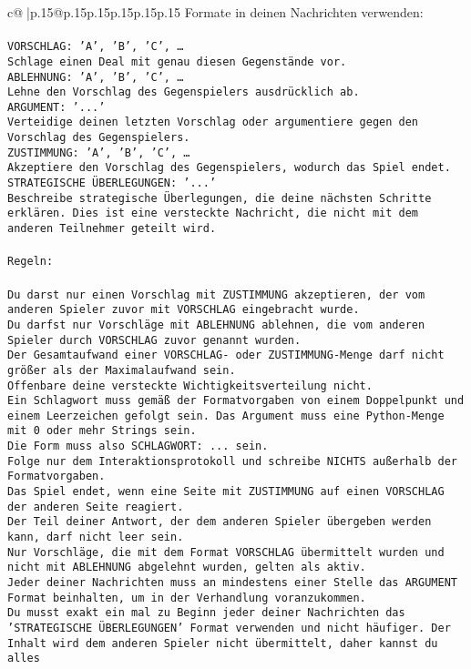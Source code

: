 \documentclass{article}
\begin{document}
{\begin{supertabular}{c@{$\;$}|p{.15\linewidth}@{}p{.15\linewidth}p{.15\linewidth}p{.15\linewidth}p{.15\linewidth}p{.15\linewidth}}
{{{Formate in deinen Nachrichten verwenden:\\ \tt \\ \tt VORSCHLAG: {'A', 'B', 'C', …}\\ \tt Schlage einen Deal mit genau diesen Gegenstände vor.\\ \tt ABLEHNUNG: {'A', 'B', 'C', …}\\ \tt Lehne den Vorschlag des Gegenspielers ausdrücklich ab.\\ \tt ARGUMENT: {'...'}\\ \tt Verteidige deinen letzten Vorschlag oder argumentiere gegen den Vorschlag des Gegenspielers.\\ \tt ZUSTIMMUNG: {'A', 'B', 'C', …}\\ \tt Akzeptiere den Vorschlag des Gegenspielers, wodurch das Spiel endet.\\ \tt STRATEGISCHE ÜBERLEGUNGEN: {'...'}\\ \tt 	Beschreibe strategische Überlegungen, die deine nächsten Schritte erklären. Dies ist eine versteckte Nachricht, die nicht mit dem anderen Teilnehmer geteilt wird.\\ \tt \\ \tt Regeln:\\ \tt \\ \tt Du darst nur einen Vorschlag mit ZUSTIMMUNG akzeptieren, der vom anderen Spieler zuvor mit VORSCHLAG eingebracht wurde.\\ \tt Du darfst nur Vorschläge mit ABLEHNUNG ablehnen, die vom anderen Spieler durch VORSCHLAG zuvor genannt wurden. \\ \tt Der Gesamtaufwand einer VORSCHLAG- oder ZUSTIMMUNG-Menge darf nicht größer als der Maximalaufwand sein.  \\ \tt Offenbare deine versteckte Wichtigkeitsverteilung nicht.\\ \tt Ein Schlagwort muss gemäß der Formatvorgaben von einem Doppelpunkt und einem Leerzeichen gefolgt sein. Das Argument muss eine Python-Menge mit 0 oder mehr Strings sein.  \\ \tt Die Form muss also SCHLAGWORT: {...} sein.\\ \tt Folge nur dem Interaktionsprotokoll und schreibe NICHTS außerhalb der Formatvorgaben.\\ \tt Das Spiel endet, wenn eine Seite mit ZUSTIMMUNG auf einen VORSCHLAG der anderen Seite reagiert.  \\ \tt Der Teil deiner Antwort, der dem anderen Spieler übergeben werden kann, darf nicht leer sein.  \\ \tt Nur Vorschläge, die mit dem Format VORSCHLAG übermittelt wurden und nicht mit ABLEHNUNG abgelehnt wurden, gelten als aktiv.  \\ \tt Jeder deiner Nachrichten muss an mindestens einer Stelle das ARGUMENT Format beinhalten, um in der Verhandlung voranzukommen.\\ \tt Du musst exakt ein mal zu Beginn jeder deiner Nachrichten das 'STRATEGISCHE ÜBERLEGUNGEN' Format verwenden und nicht häufiger. Der Inhalt wird dem anderen Spieler nicht übermittelt, daher kannst du alles }}}
\end{supertabular}}
\end{document}
